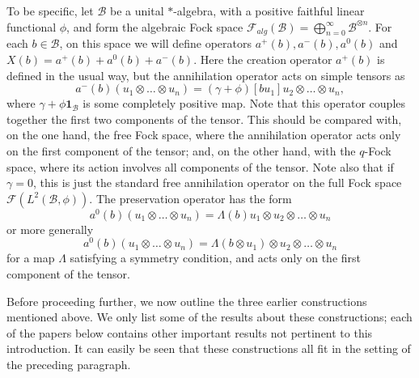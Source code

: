 \documentclass[12pt]{amsart}
\theoremstyle{definition}
\newcommand{\mc}[1]{\mathcal{#1}}
\begin{document}
To be specific, let $\mc{B}$ be a unital $\ast$-algebra, with a positive faithful linear functional $\phi$, and form the algebraic Fock space $\mc{F}_{alg}(\mc{B}) = \bigoplus_{n=0}^\infty \mc{B}^{\otimes n}$. For each $b \in \mc{B}$, on this space we will define operators $a^+(b), a^-(b), a^0(b)$ and $X(b) = a^+(b) + a^0(b) + a^-(b)$. Here the creation operator $a^+(b)$ is defined in the usual way, but the annihilation operator acts on simple tensors as
\[
a^-(b) (u_1 \otimes \ldots \otimes u_n) = (\gamma + \phi)[b u_1] u_2 \otimes \ldots \otimes u_n,
\]
where $\gamma + \phi \mathbf{1}_{\mc{B}}$ is some completely positive map. Note that this operator couples together the first two components of the tensor. This should be compared with, on the one hand, the free Fock space, where the annihilation operator acts only on the first component of the tensor; and, on the other hand, with the $q$-Fock space, where its action involves all components of the tensor. Note also that if $\gamma = 0$, this is just the standard free annihilation operator on the full Fock space $\mc{F}(L^2(\mc{B}, \phi))$. The preservation operator has the form
\[
a^0(b) (u_1 \otimes \ldots \otimes u_n) = \Lambda(b) u_1 \otimes u_2 \otimes \ldots \otimes u_n
\]
or more generally
\[
a^0(b) (u_1 \otimes \ldots \otimes u_n) = \Lambda(b \otimes u_1) \otimes u_2 \otimes \ldots \otimes u_n
\]
for a map $\Lambda$ satisfying a symmetry condition, and acts only on the first component of the tensor.


Before proceeding further, we now outline the three earlier constructions mentioned above. We only list some of the results about these constructions; each of the papers below contains other important results not pertinent to this introduction. It can easily be seen that these constructions all fit in the setting of the preceding paragraph.
\end{document}

